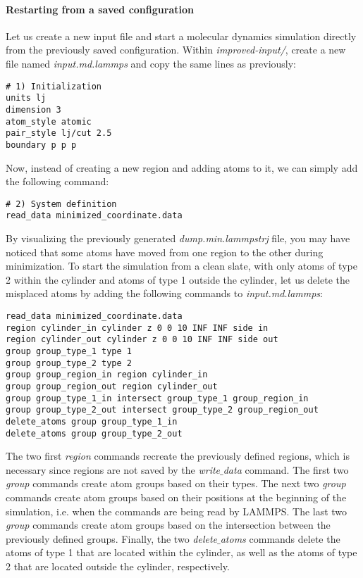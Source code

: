 \paragraph{Restarting from a saved configuration}
Let us create a new input file and start a molecular dynamics simulation directly from the previously saved configuration. Within \textit{improved-input/}, create a new file named \textit{input.md.lammps} and copy the same lines as previously:
\begin{verbatim}
# 1) Initialization
units lj
dimension 3
atom_style atomic
pair_style lj/cut 2.5
boundary p p p
\end{verbatim}
Now, instead of creating a new region and adding atoms to it, we can simply add the following command:
\begin{verbatim}
# 2) System definition
read_data minimized_coordinate.data
\end{verbatim}
By visualizing the previously generated \textit{dump.min.lammpstrj} file, you may have noticed that some atoms have moved from one region to the other during minimization. To start the simulation from a clean slate, with only atoms of type 2 within the cylinder and atoms of type
1 outside the cylinder, let us delete the misplaced atoms by adding the following commands to \textit{input.md.lammps}:
\begin{verbatim}
read_data minimized_coordinate.data
region cylinder_in cylinder z 0 0 10 INF INF side in
region cylinder_out cylinder z 0 0 10 INF INF side out
group group_type_1 type 1
group group_type_2 type 2
group group_region_in region cylinder_in
group group_region_out region cylinder_out
group group_type_1_in intersect group_type_1 group_region_in
group group_type_2_out intersect group_type_2 group_region_out
delete_atoms group group_type_1_in
delete_atoms group group_type_2_out
\end{verbatim}
The two first \textit{region} commands recreate the previously defined regions, which is necessary since regions are not saved by the \textit{write$\_$data} command. The first two \textit{group} commands create atom groups based on their types. The next two \textit{group} commands create atom groups based on their
positions at the beginning of the simulation, i.e. when the commands are being read by LAMMPS. The last two \textit{group} commands create atom groups based on the intersection between the previously defined groups. Finally, the two \textit{delete$\_$atoms} commands delete the atoms of type 1 that are located within the cylinder, as well as the atoms of type 2 that are located outside the cylinder, respectively. 

